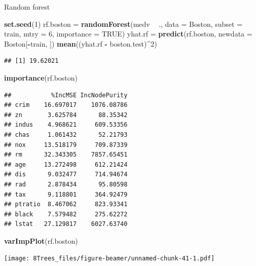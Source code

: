 \documentclass[10pt,ignorenonframetext,]{beamer}
\newenvironment{Shaded}{\begin{snugshade}}{\end{snugshade}}
\newcommand{\KeywordTok}[1]{\textcolor[rgb]{0.13,0.29,0.53}{\textbf{#1}}}
\newcommand{\DataTypeTok}[1]{\textcolor[rgb]{0.13,0.29,0.53}{#1}}
\newcommand{\DecValTok}[1]{\textcolor[rgb]{0.00,0.00,0.81}{#1}}
\newcommand{\StringTok}[1]{\textcolor[rgb]{0.31,0.60,0.02}{#1}}
\newcommand{\OtherTok}[1]{\textcolor[rgb]{0.56,0.35,0.01}{#1}}
\newcommand{\OperatorTok}[1]{\textcolor[rgb]{0.81,0.36,0.00}{\textbf{#1}}}
\newcommand{\NormalTok}[1]{#1}
\begin{document}
\begin{frame}[fragile]

\begin{block}{Random forest}

\begin{Shaded}
\begin{Highlighting}[]
\KeywordTok{set.seed}\NormalTok{(}\DecValTok{1}\NormalTok{)}
\NormalTok{rf.boston =}\StringTok{ }\KeywordTok{randomForest}\NormalTok{(medv }\OperatorTok{~}\StringTok{ }\NormalTok{., }\DataTypeTok{data =}\NormalTok{ Boston, }\DataTypeTok{subset =}\NormalTok{ train, }
    \DataTypeTok{mtry =} \DecValTok{6}\NormalTok{, }\DataTypeTok{importance =} \OtherTok{TRUE}\NormalTok{)}
\NormalTok{yhat.rf =}\StringTok{ }\KeywordTok{predict}\NormalTok{(rf.boston, }\DataTypeTok{newdata =}\NormalTok{ Boston[}\OperatorTok{-}\NormalTok{train, ])}
\KeywordTok{mean}\NormalTok{((yhat.rf }\OperatorTok{-}\StringTok{ }\NormalTok{boston.test)}\OperatorTok{^}\DecValTok{2}\NormalTok{)}
\end{Highlighting}
\end{Shaded}

\begin{verbatim}
## [1] 19.62021
\end{verbatim}

\begin{Shaded}
\begin{Highlighting}[]
\KeywordTok{importance}\NormalTok{(rf.boston)}
\end{Highlighting}
\end{Shaded}

\begin{verbatim}
##           %IncMSE IncNodePurity
## crim    16.697017    1076.08786
## zn       3.625784      88.35342
## indus    4.968621     609.53356
## chas     1.061432      52.21793
## nox     13.518179     709.87339
## rm      32.343305    7857.65451
## age     13.272498     612.21424
## dis      9.032477     714.94674
## rad      2.878434      95.80598
## tax      9.118801     364.92479
## ptratio  8.467062     823.93341
## black    7.579482     275.62272
## lstat   27.129817    6027.63740
\end{verbatim}

\begin{Shaded}
\begin{Highlighting}[]
\KeywordTok{varImpPlot}\NormalTok{(rf.boston)}
\end{Highlighting}
\end{Shaded}

\texttt{[image: 8Trees\_files/figure-beamer/unnamed-chunk-41-1.pdf]}

\end{block}

\end{frame}
\end{document}
